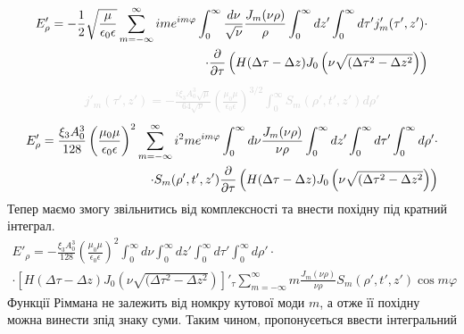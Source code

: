 %
\begin{equation*} \begin{aligned}
E'_\rho = - \frac{1}{2}  \sqrt{\frac{\mu}{\epsilon_0 \epsilon}}
\sum_{m=-\infty}^\infty i m e^{im\varphi} \int_0^\infty 
\frac{d \nu}{\sqrt{\nu}} \frac{J_m(\nu \rho)}{\rho} \int_0^\infty dz' 
\int_0^\infty d \tau' j'_m (\tau',z') \cdot \\
\cdot \frac{\partial }{\partial \tau} \left( H(\Delta \tau - \Delta z) 
J_0 \left( \nu \sqrt{(\Delta \tau^2 - \Delta z^2} \right) \right)
\end{aligned} \end{equation*}
%
\textcolor{lightgray} {  \begin{equation*} \begin{aligned} 
j'_m (\tau',z') = - \frac{i \xi_3 A_0^3 \sqrt{\mu}}{64 \sqrt{\nu}}
\left( \frac{\mu_0 \mu} {\epsilon_0 \epsilon} \right)^{3/2}
\int_0^\infty S_m (\rho',t',z') d \rho'
\end{aligned} \end{equation*} }
%
\textcolor{lightgray} {  \begin{equation*} \begin{aligned}
E'_\rho = \frac{\xi_3 A_0^3}{128} 
\left( \frac{\mu_0 \mu}{\epsilon_0 \epsilon} \right)^2
\sum_{m=-\infty}^\infty i^2 m e^{im\varphi} \int_0^\infty d \nu 
\frac{J_m(\nu \rho)}{\nu \rho} \int_0^\infty dz' 
\int_0^\infty d \tau' \int_0^\infty d \rho' \cdot \\
\cdot S_m (\rho',t',z') \frac{\partial }{\partial \tau} \left( H(\Delta \tau - \Delta z) 
J_0 \left( \nu \sqrt{(\Delta \tau^2 - \Delta z^2} \right) \right)
\end{aligned} \end{equation*} }
%
Тепер маємо змогу звільнитись від комплексності та внести похідну під 
кратний інтеграл.
%
\begin{equation*} \begin{aligned}
E'_\rho = - \frac{\xi_3 A_0^3}{128} 
\left( \frac{\mu_0 \mu}{\epsilon_0 \epsilon} \right)^2
\int_0^\infty d \nu \int_0^\infty dz' 
\int_0^\infty d \tau' \int_0^\infty d \rho' \cdot \\
\cdot \left[ H(\Delta \tau - \Delta z) 
J_0 \left( \nu \sqrt{(\Delta \tau^2 - \Delta z^2} \right) \right]'_\tau
 \sum_{m=-\infty}^\infty m \frac{J_m(\nu \rho)}{\nu \rho} 
S_m (\rho',t',z') \cos m \varphi
\end{aligned} \end{equation*}
%
Функції Ріммана не залежить від номкру кутової моди $ m $, а отже її похідну 
можна винести зпід знаку суми. Таким чином, пропонуєеться ввести інтегральний
